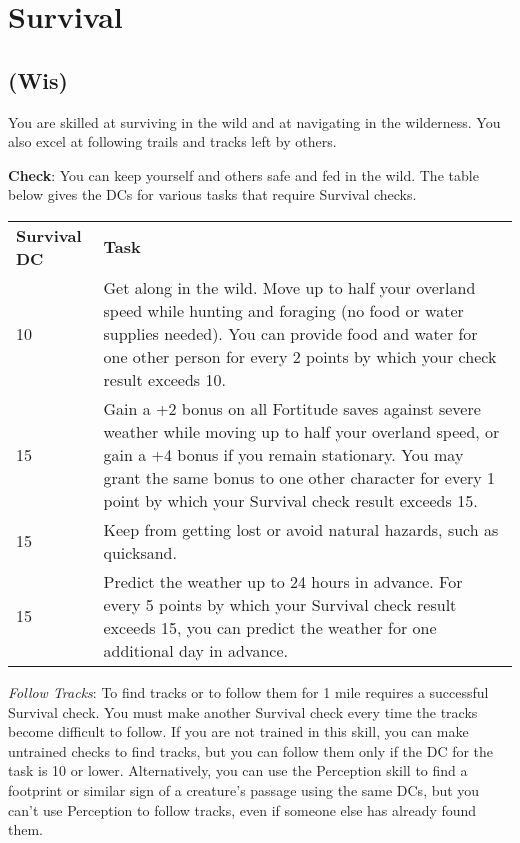 \section{Survival}

\label{f0}
\subsection{(Wis)}

				
You are skilled at surviving in the wild and at navigating in the wilderness. You also excel at following trails and tracks left by others.
				
\textbf{Check}: You can keep yourself and others safe and fed in the wild. The table below gives the DCs for various tasks that require Survival checks.

\begin{table}
\sffamily

 \begin{tabularx}{\linewidth}{lX}

\textbf{Survival DC} & \textbf{Task}\\
10 & Get along in the wild. Move up to half your overland speed while hunting and foraging (no food or water supplies needed). You can provide food and water for one other person for every 2 points by which your check result exceeds 10.\\
15 & Gain a +2 bonus on all Fortitude saves against severe weather while moving up to half your overland speed, or gain a +4 bonus if you remain stationary. You may grant the same bonus to one other character for every 1 point by which your Survival check result exceeds 15.\\
15 & Keep from getting lost or avoid natural hazards, such as quicksand.\\
15 & Predict the weather up to 24 hours in advance. For every 5 points by which your Survival check result exceeds 15, you can predict the weather for one additional day in advance.\\
 \end{tabularx}

\end{table}

				
\textit{Follow Tracks}: To find tracks or to follow them for 1 mile requires a successful Survival check. You must make another Survival check every time the tracks become difficult to follow. If you are not trained in this skill, you can make untrained checks to find tracks, but you can follow them only if the DC for the task is 10 or lower. Alternatively, you can use the Perception skill to find a footprint or similar sign of a creature's passage using the same DCs, but you can't use Perception to follow tracks, even if someone else has already found them.
				
